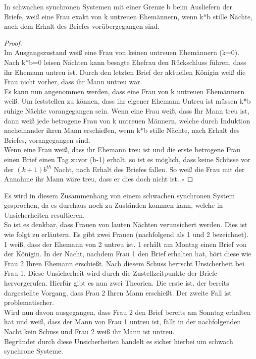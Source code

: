 \begin{satz} 
\label{prop_weak_sync}
In schwachen synchronen Systemen mit einer Grenze b beim Ausliefern der Briefe, weiß eine Frau exakt von k untreuen Ehemännern, wenn k*b stille Nächte, nach dem Erhalt des Briefes vorübergegangen sind.
\end{satz}
\begin{proof}\hfill\\
Im Ausgangszustand weiß eine Frau von keinen untreuen Ehemännern (k=0). Nach k*b=0 leisen Nächten kann besagte Ehefrau den Rückschluss führen, dass ihr Ehemann untreu ist. Durch den letzten Brief der aktuellen Königin weiß die Frau nicht vorher, dass ihr Mann untreu war. \\Es kann nun angenommen werden, dass eine Frau von k untreuen Ehemännern weiß. Um feststellen zu können, dass ihr eigener Ehemann Untreu ist müssen k*b ruhige Nächte vorangegangen sein. Wenn eine Frau weiß, dass Ihr Mann treu ist, dann weiß jede betrogene Frau von k untreuen Männern, welche durch Induktion nacheinander ihren Mann erschießen, wenn k*b stille Nächte, nach Erhalt des Briefes, vorangegangen sind.\\ Wenn eine Frau weiß, dass ihr Ehemann treu ist und die erste betrogene Frau einen Brief einen Tag zuvor (b-1) erhält, so ist es möglich, dass keine Schüsse vor der $(k+1)b^{th}$ Nacht, nach Erhalt des Briefes fallen. So weiß die Frau mit der Annahme ihr Mann wäre treu, dass er dies doch nicht ist.
$\square$
\end{proof}
Es wird in diesem Zusammenhang von einem schwachen synchronen System gesprochen, da es durchaus noch zu Zuständen kommen kann, welche in Unsicherheiten resultieren. \\So ist es denkbar, dass Frauen von lauten Nächten verunsichert werden. Dies ist wie folgt zu erläutern. Es gibt zwei Frauen (nachfolgend als 1 und 2 bezeichnet). 1 weiß, dass der Ehemann von 2 untreu ist. 1 erhält am Montag einen Brief von der Königin. In der Nacht, nachdem Frau 1 den Brief erhalten hat, hört diese wie Frau 2 Ihren Ehemann erschießt. Nach diesem Schuss herrscht Unsicherheit bei Frau 1. Diese Unsicherheit wird durch die Zustellzeitpunkte der Briefe hervorgerufen. Hierfür gibt es nun zwei Theorien. Die erste ist, der bereits dargestellte Vorgang, dass Frau 2 Ihren Mann erschießt. Der zweite Fall ist problematischer.\\ Wird nun davon ausgegangen, dass Frau 2 den Brief bereits am Sonntag erhalten hat und weiß, dass der Mann von Frau 1 untreu ist, fällt in der nachfolgenden Nacht kein Schuss und Frau 2 weiß ihr Mann ist untreu. \\
Begründet durch diese Unsicherheiten handelt es sicher hierbei um schwach synchrone Systeme. 

